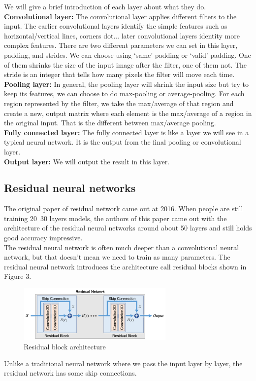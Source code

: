 \documentclass{article}
\begin{document}
We will give a brief introduction of each layer about what they do.\\
\textbf{Convolutional layer: }The convolutional layer applies different filters to the input. The earlier convolutional layers identify the simple features such as horizontal/vertical lines, corners dot... later convolutional layers identity more complex features. There are two different parameters we can set in this layer, padding, and strides. We can choose using ‘same’ padding or ‘valid’ padding. One of them shrinks the size of the input image after the filter, one of them not. The stride is an integer that tells how many pixels the filter will move each time. \\
\textbf{Pooling layer: }In general, the pooling layer will shrink the input size but try to keep its features, we can choose to do max-pooling or average-pooling. For each region represented by the filter, we take the max/average of that region and create a new, output matrix where each element is the max/average of a region in the original input. That is the different between max/average pooling.\\
\textbf{Fully connected layer: }The fully connected layer is like a layer we will see in a typical neural network. It is the output from the final pooling or convolutional layer. \\
\textbf{Output layer: }We will output the result in this layer.

\subsection{Residual neural networks}
The original paper of residual network came out at 2016\cite{he2016deep}. When people are still training 20~30 layers models, the authors of this paper\cite{he2016deep} came out with the architecture of the residual neural networks around about 50 layers and still holds good accuracy impressive. \\
The residual neural network is often much deeper than a convolutional neural network, but that doesn’t mean we need to train as many parameters. The residual neural network introduces the architecture call residual blocks shown in Figure 3.
\begin{figure}[H]
 \centering
    \includegraphics[width=3.0in]{figs/resblock}
    \caption{Residual block architecture}
\end{figure}
Unlike a traditional neural network where we pass the input layer by layer, the residual network has some skip connections.
\end{document}
